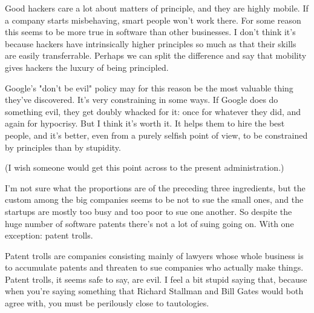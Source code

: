 Good hackers care a lot
                  about matters of principle, and they are highly mobile. If a
                  company starts misbehaving, smart people won't work there. For
                  some reason this seems to be more true in software than other
                  businesses. I don't think it's because hackers have
                  intrinsically higher principles so much as that their skills
                  are easily transferrable. Perhaps we can split the difference
                  and say that mobility gives hackers the luxury of being
                  principled.

Google's "don't be evil" policy may for
                  this reason be the most valuable thing they've discovered.
                  It's very constraining in some ways. If Google does do
                  something evil, they get doubly whacked for it: once for
                  whatever they did, and again for hypocrisy. But I think it's
                  worth it. It helps them to hire the best people, and it's
                  better, even from a purely selfish point of view, to be
                  constrained by principles than by stupidity.

(I
                  wish someone would get this point across to the present
                  administration.)

I'm not sure what the proportions
                  are of the preceding three ingredients, but the custom among
                  the big companies seems to be not to sue the small ones, and
                  the startups are mostly too busy and too poor to sue one
                  another. So despite the huge number of software patents
                  there's not a lot of suing going on. With one exception:
                  patent trolls.

Patent trolls are companies
                  consisting mainly of lawyers whose whole business is to
                  accumulate patents and threaten to sue companies who actually
                  make things. Patent trolls, it seems safe to say, are evil. I
                  feel a bit stupid saying that, because when you're saying
                  something that Richard Stallman and Bill Gates would both
                  agree with, you must be perilously close to tautologies.

